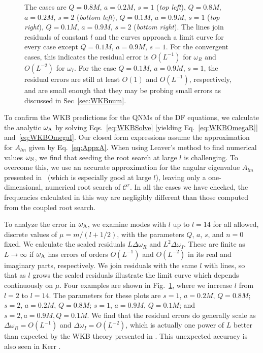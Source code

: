 \begin{refsection}
\begin{figure}[tb]
{The cases are $Q=0.8M$, $a=0.2M$, $s = 1$ ({\it top left}),  $Q=0.8M$, $a=0.2M$, $s = 2$ ({\it bottom left}), $Q=0.1M$, $a=0.9M$, $s = 1$ ({\it top right}), $Q=0.1M$, $a=0.9M$, $s = 2$ ({\it bottom right}). 
The lines join residuals of constant $l$ and the curves approach a limit curve for every case except  $Q=0.1M$, $a=0.9M$, $s = 1$. For the convergent cases, this indicates the residual error is $O(L^{-1})$ for $\omega_R$ and $O(L^{-2})$ for $\omega_I$. For the case $Q=0.1M$, $a=0.9M$, $s = 1$, the residual errors are still at least $O(1)$ and $O(L^{-1})$, respectively, and are small enough that they may be probing small errors as discussed in Sec~\ref{sec:WKBnum}.}
\label{fig:DFeik}
\end{figure}

To confirm the WKB predictions for the QNMs of the DF equations, we calculate the analytic $\omega_{\rm A}$ by solving Eqs.~\eqref{eq:WKBSolve} [yielding Eq.~\eqref{eq:WKBOmegaR}] and~\eqref{eq:WKBOmegaI}.
Our closed form expressions assume the approximation for $A_{lm}$ given by Eq.~\eqref{eq:AppxA}. 
When using Leaver's method to find numerical values $\omega_{\rm N}$, we find that seeding the root search at large $l$ is challenging.
To overcome this, we use an accurate approximation for the angular eigenvalue $A_{lm}$ presented in~\cite{Berti:2005gp} (which is especially good at large $l$), leaving only a one-dimensional, numerical root search of $\mathcal C^r$.
In all the cases we have checked, the frequencies calculated in this way are negligibly different than those computed from the coupled root search.

To analyze the error in $\omega_{\rm A}$, we examine modes with $l$ up to $l=14$ for all allowed, discrete values of $\mu=m/(l+1/2)$, with the parameters $Q$, $a$, $s$, and $n=0$ fixed. 
We calculate the scaled residuals $L\Delta \omega_R$ and $L^2\Delta \omega_I$.
These are finite as $L\to\infty$ if $\omega_{\rm A}$ has errors of orders $O(L^{-1})$ and $O(L^{-2})$ in its real and imaginary parts, respectively. 
We join residuals with the same $l$ with lines, so that as $l$ grows the scaled residuals illustrate the limit curve which depends continuously on $\mu$. Four examples are shown in Fig.~\ref{fig:DFeik}, where we increase $l$ from $l = 2$ to $l = 14$.
The parameters for these plots are $s = 1$, $a = 0.2M$, $Q = 0.8M$; $s = 2$, $a = 0.2M$, $Q = 0.8M$; $s = 1$, $a = 0.9M$, $Q = 0.1M$; and $s = 2, a = 0.9M, Q = 0.1M$. We find that the residual errors do generally scale as $\Delta\omega_R = O(L^{-1})$ and $\Delta\omega_I = O(L^{-2})$, which is actually one power of $L$ better than expected by the WKB theory presented in \cite{Schutz:1985zz}. This unexpected accuracy is also seen in Kerr \cite{Yang:2012he}.


\end{refsection}
